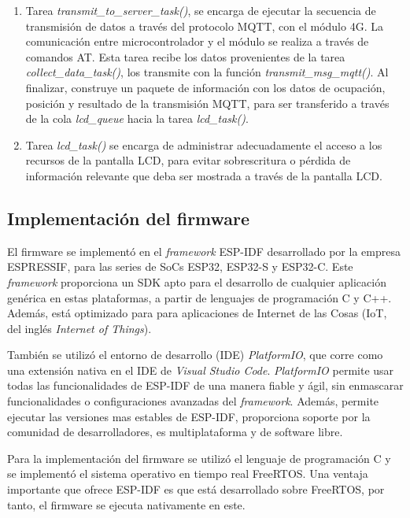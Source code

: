 \begin{enumerate}
	\item Tarea \textit{transmit\_to\_server\_task()}, se encarga de ejecutar la secuencia de transmisión de datos a través del protocolo MQTT, con el módulo 4G. La comunicación entre microcontrolador y el módulo se realiza a través de comandos AT. Esta tarea recibe los datos provenientes de la tarea \textit{collect\_data\_task()}, los transmite con la función \textit{transmit\_msg\_mqtt()}. Al finalizar, construye un paquete de información con los datos de ocupación, posición y resultado de la transmisión MQTT, para ser transferido a través de la cola \textit{lcd\_queue} hacia la tarea \textit{lcd\_task()}. 
		
	\item Tarea \textit{lcd\_task()} se encarga de administrar adecuadamente el acceso a los recursos de la pantalla LCD, para evitar sobrescritura o pérdida de información relevante que deba ser mostrada a través de la pantalla LCD. 
\end{enumerate}



\subsection{Implementación del firmware}
\label{sec:implementacion_firmware}

El firmware se implementó en el \textit{framework} ESP-IDF desarrollado por la empresa ESPRESSIF, para las series de SoCs ESP32, ESP32-S y ESP32-C. Este \textit{framework} proporciona un SDK apto para el desarrollo de cualquier aplicación genérica en estas plataformas, a partir de lenguajes de programación C y C++. Además, está optimizado para para aplicaciones de Internet de las Cosas (IoT, del inglés \textit{Internet of Things}). 

También se utilizó el entorno de desarrollo (IDE) \textit{PlatformIO}, que corre como una extensión nativa en el IDE de \textit{Visual Studio Code}. \textit{PlatformIO} permite usar todas las funcionalidades de ESP-IDF de una manera fiable y ágil, sin enmascarar funcionalidades o configuraciones avanzadas del \textit{framework}. Además, permite ejecutar las versiones mas estables de ESP-IDF, proporciona soporte por la comunidad de desarrolladores, es multiplataforma y de software libre. 

Para la implementación del firmware se utilizó el lenguaje de programación C y se implementó el sistema operativo en tiempo real FreeRTOS. Una ventaja importante que ofrece ESP-IDF es que está desarrollado sobre FreeRTOS, por tanto, el firmware se ejecuta nativamente en este. 

